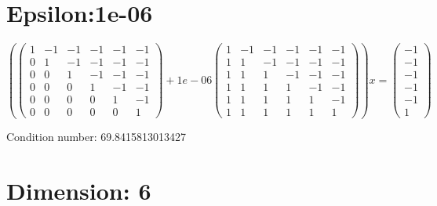 \documentclass{article}%
\begin{document}
\section{Epsilon:1e{-}06}%
\label{sec:Epsilon1e{-}06}%
\[%
( \begin{pmatrix}%
1&-1&-1&-1&-1&-1\\%
0&1&-1&-1&-1&-1\\%
0&0&1&-1&-1&-1\\%
0&0&0&1&-1&-1\\%
0&0&0&0&1&-1\\%
0&0&0&0&0&1%
\end{pmatrix} + 1e{-}06 \begin{pmatrix}%
1&-1&-1&-1&-1&-1\\%
1&1&-1&-1&-1&-1\\%
1&1&1&-1&-1&-1\\%
1&1&1&1&-1&-1\\%
1&1&1&1&1&-1\\%
1&1&1&1&1&1%
\end{pmatrix} )x = \begin{pmatrix}%
-1\\%
-1\\%
-1\\%
-1\\%
-1\\%
1%
\end{pmatrix}%
\]%
\begin{Large}%
Condition number:%
69.8415813013427%
\end{Large}

%
\section{Dimension: 6}%
\label{sec:Dimension6}%
\end{document}
